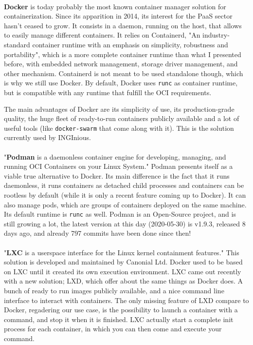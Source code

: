\paragraph{}\textbf{Docker}\cite{merkel2014docker} is today probably the most known container manager solution for containerization.  Since its apparition in 2014, its interest for the PaaS sector hasn't ceased to grow.  It consists in a daemon, running on the host, that allows to easily manage different containers.  It relies on Containerd, "An industry-standard container runtime with an emphasis on simplicity, robustness and portability"\cite{containerd}, which is a more complete container runtime than what I presented before, with embedded network management, storage driver management, and other mechanism.  Containerd is not meant to be used standalone though, which is why we still use Docker.  By default, Docker uses \texttt{runc} as container runtime, but is compatible with any runtime that fulfill the OCI\cite{oci} requirements.

The main advantages of Docker are its simplicity of use, its production-grade quality, the huge fleet of ready-to-run containers publicly available and a lot of useful tools (like \texttt{docker-swarm} that come along with it).  This is the solution currently used by INGInious.

\paragraph{}"\textbf{Podman} is a daemonless container engine for developing, managing, and running OCI\cite{oci} Containers on your Linux System."\cite{podman}  Podman presents itself as a viable true alternative to Docker.  Its main difference is the fact that it runs daemonless, it runs containers as detached child processes and containers can be rootless by default (while it is only a recent feature coming up to Docker).  It can also manage pods, which are groups of containers deployed on the same machine. Its default runtime is \texttt{runc} as well.  Podman is an Open-Source project, and is still growing a lot, the latest version at this day (2020-05-30) is v1.9.3, released 8 days ago, and already 797 commits have been done since then!

\paragraph{}"\textbf{LXC} is a userspace interface for the Linux kernel containment features."\cite{lxc}  This solution is developed and maintained by Canonial Ltd.  Docker used to be based on LXC until it created its own execution environment.  LXC came out recently with a new solution; LXD, which offer about the same things as Docker does.  A bunch of ready to run images publicly available, and a nice command line interface to interact with containers.  The only missing feature of LXD compare to Docker, regadering our use case, is the possibility to launch a container with a command, and stop it when it is finished.  LXC actually start a complete init process for each container, in which you can then come and execute your command.

